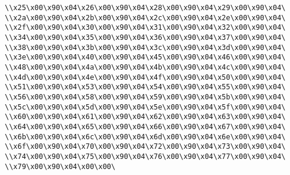 \verb|\\x25\x00\x90\x04\x26\x00\x90\x04\x28\x00\x90\x04\x29\x00\x90\x04\|\newline
\verb|\\x2a\x00\x90\x04\x2b\x00\x90\x04\x2c\x00\x90\x04\x2e\x00\x90\x04\|\newline
\verb|\\x2f\x00\x90\x04\x30\x00\x90\x04\x31\x00\x90\x04\x32\x00\x90\x04\|\newline
\verb|\\x34\x00\x90\x04\x35\x00\x90\x04\x36\x00\x90\x04\x37\x00\x90\x04\|\newline
\verb|\\x38\x00\x90\x04\x3b\x00\x90\x04\x3c\x00\x90\x04\x3d\x00\x90\x04\|\newline
\verb|\\x3e\x00\x90\x04\x40\x00\x90\x04\x45\x00\x90\x04\x46\x00\x90\x04\|\newline
\verb|\\x48\x00\x90\x04\x4a\x00\x90\x04\x4b\x00\x90\x04\x4c\x00\x90\x04\|\newline
\verb|\\x4d\x00\x90\x04\x4e\x00\x90\x04\x4f\x00\x90\x04\x50\x00\x90\x04\|\newline
\verb|\\x51\x00\x90\x04\x53\x00\x90\x04\x54\x00\x90\x04\x55\x00\x90\x04\|\newline
\verb|\\x56\x00\x90\x04\x58\x00\x90\x04\x59\x00\x90\x04\x5b\x00\x90\x04\|\newline
\verb|\\x5c\x00\x90\x04\x5d\x00\x90\x04\x5e\x00\x90\x04\x5f\x00\x90\x04\|\newline
\verb|\\x60\x00\x90\x04\x61\x00\x90\x04\x62\x00\x90\x04\x63\x00\x90\x04\|\newline
\verb|\\x64\x00\x90\x04\x65\x00\x90\x04\x66\x00\x90\x04\x67\x00\x90\x04\|\newline
\verb|\\x6b\x00\x90\x04\x6c\x00\x90\x04\x6d\x00\x90\x04\x6e\x00\x90\x04\|\newline
\verb|\\x6f\x00\x90\x04\x70\x00\x90\x04\x72\x00\x90\x04\x73\x00\x90\x04\|\newline
\verb|\\x74\x00\x90\x04\x75\x00\x90\x04\x76\x00\x90\x04\x77\x00\x90\x04\|\newline
\verb|\\x79\x00\x90\x04\x00\x00\|\newline
